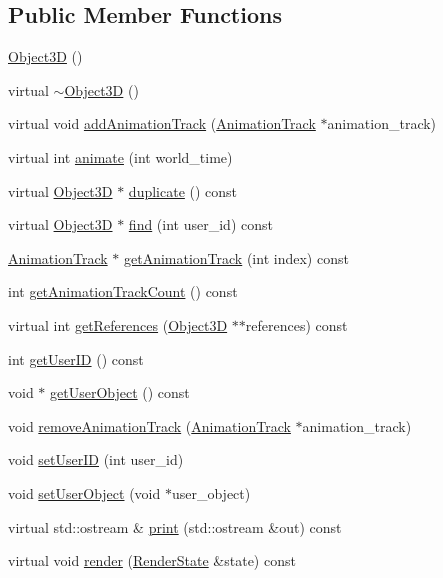 \subsection*{Public Member Functions}
\begin{CompactItemize}
\item 
\hyperlink{classm3g_1_1Object3D_f4b10c33b9014a3f0a675ef4b699b773}{Object3D} ()
\item 
virtual \hyperlink{classm3g_1_1Object3D_8ece10725587e63a2c75283c16cc4df5}{$\sim$Object3D} ()
\item 
virtual void \hyperlink{classm3g_1_1Object3D_415c0b110f95410ded9b85e5d99a496b}{addAnimationTrack} (\hyperlink{classm3g_1_1AnimationTrack}{AnimationTrack} $\ast$animation\_\-track)
\item 
virtual int \hyperlink{classm3g_1_1Object3D_8aad1ceab4c2a03609c8a42324ce484d}{animate} (int world\_\-time)
\item 
virtual \hyperlink{classm3g_1_1Object3D}{Object3D} $\ast$ \hyperlink{classm3g_1_1Object3D_a25110dac934f867b83b73ad4741a0f4}{duplicate} () const 
\item 
virtual \hyperlink{classm3g_1_1Object3D}{Object3D} $\ast$ \hyperlink{classm3g_1_1Object3D_01924458161ea59220f2cc29339e2b00}{find} (int user\_\-id) const 
\item 
\hyperlink{classm3g_1_1AnimationTrack}{AnimationTrack} $\ast$ \hyperlink{classm3g_1_1Object3D_f0978f3f2efe3227ca613da3361424dd}{getAnimationTrack} (int index) const 
\item 
int \hyperlink{classm3g_1_1Object3D_0926843b66090795972850376b8e4e6c}{getAnimationTrackCount} () const 
\item 
virtual int \hyperlink{classm3g_1_1Object3D_d52d3c63076c4341b34c3631a17820e4}{getReferences} (\hyperlink{classm3g_1_1Object3D}{Object3D} $\ast$$\ast$references) const 
\item 
int \hyperlink{classm3g_1_1Object3D_b8d9067364251d0208fcdc502d394e2c}{getUserID} () const 
\item 
void $\ast$ \hyperlink{classm3g_1_1Object3D_a9b8541216c1fa7792617218a5fb6672}{getUserObject} () const 
\item 
void \hyperlink{classm3g_1_1Object3D_e36d8f8544daee6bd4e2ccd6755ed03d}{removeAnimationTrack} (\hyperlink{classm3g_1_1AnimationTrack}{AnimationTrack} $\ast$animation\_\-track)
\item 
void \hyperlink{classm3g_1_1Object3D_8eaa86665b4ca2c39691b6efc50108ee}{setUserID} (int user\_\-id)
\item 
void \hyperlink{classm3g_1_1Object3D_2285b0af7d6d293c4cf0e0d4559fd9b5}{setUserObject} (void $\ast$user\_\-object)
\item 
virtual std::ostream \& \hyperlink{classm3g_1_1Object3D_6fea17fa1532df3794f8cb39cb4f911f}{print} (std::ostream \&out) const 
\item 
virtual void \hyperlink{classm3g_1_1Object3D_8babc8a79b78615da51161e94029eea9}{render} (\hyperlink{structm3g_1_1RenderState}{RenderState} \&state) const 
\end{CompactItemize}


